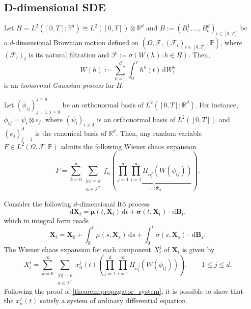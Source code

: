 \documentclass[12pt]{article}
\theoremstyle{remark}
\theoremstyle{plain}
\numberwithin{equation}{section}
\newcommand{\dd}{\ensuremath{\,\mathrm d}}
\newcommand{\R}{\mathbb{R}}
\begin{document}
\subsection{D-dimensional SDE}\label{sec:d dimensional}

Let $H = L^2([0,T]; \R^d) \cong L^2([0,T]) \otimes \R^d$ and $B := (B_t^1, \dots, B_t^d)_{t \in [0,T]}$ be a $d$-dimensional Brownian motion defined on $(\Omega, \mathcal F, (\mathcal F_t)_{t \in [0,T]}, \mathbb P)$, where $(\mathcal F_t)_t$ is its natural filtration and $\mathcal F := \sigma(W(h) : h \in H)$. Then,
\begin{equation*}
    W(h) := \sum_{k=1}^d \int_0^T h^k(t) \dd W_t^k
\end{equation*}
is an \emph{isonormal Gaussian process} for $H$.

Let $(\phi_{ij})_{j=1,i \geq 0}^{j=d}$ be an orthonormal basis of $L^2([0,T]; \R^d)$.
For instance, $\phi_{ij} = \psi_i \otimes e_j$, where $(\psi_i)_{i \geq 0}$ is an orthonormal basis of $L^2([0,T])$ and $(e_j)_{j=1}^d$ is the canonical basis of $\R^d$.
Then, any random variable $F \in L^2(\Omega, \mathcal F, \mathbb P)$ admits the following Wiener chaos expansion
\begin{equation*}
    F = \sum_{k=0}^\infty \sum_{\substack{|\alpha|=k\\\alpha \in \mathcal I^d}} f_\alpha \left(\underbrace{\prod_{j=1}^d \prod_{i=1}^\infty H_{\alpha_i^j}(W(\phi_{ij}))}_{=:\Psi_\alpha}\right).
\end{equation*}

Consider the following $d$-dimensional It\^o process
\begin{equation*}
    \dd\mathbf X_t = \mathbf\mu(t, \mathbf X_t)\dd t + \mathbf\sigma(t, \mathbf X_t)\cdot\dd\mathbf B_t,
\end{equation*}
which in integral form reads
\begin{equation*}
    \mathbf X_t = \mathbf X_0 + \int_0^t \mu(s, \mathbf X_s)\dd s + \int_0^t \sigma(s, \mathbf X_s)\cdot \dd\mathbf B_s.
\end{equation*}
The Wiener chaos expansion for each component $X_t^j$ of $\mathbf X_t$ is given by
\begin{equation*}
    X_t^j = \sum_{k=0}^\infty \sum_{\substack{|\alpha|=k\\\alpha \in \mathcal I^d}} x_\alpha^j(t) \left(\prod_{j=1}^d \prod_{i=1}^\infty H_{\alpha_i^j}(W(\phi_{ij}))\right),\qquad 1\leq j\leq d.
\end{equation*}
Following the proof of \cref{theorem:propagator_system}, it is possible to show that the $x_\alpha^j(t)$ satisfy a system of ordinary differential equation.
\end{document}
